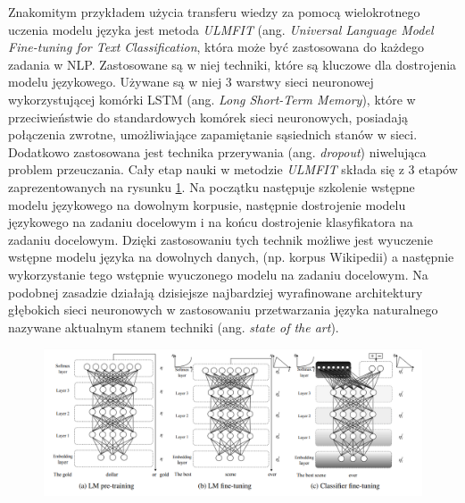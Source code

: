 Znakomitym przykładem użycia transferu wiedzy za pomocą wielokrotnego uczenia modelu języka jest metoda \textit{ULMFIT} \cite{howard2018universal} (ang. \textit{Universal Language Model Fine-tuning for Text Classification}, która może być zastosowana do każdego zadania w NLP. Zastosowane są w niej techniki, które są kluczowe dla dostrojenia modelu językowego. Używane są w niej 3 warstwy sieci neuronowej wykorzystującej komórki LSTM (ang. \textit{Long Short-Term Memory}), które w przeciwieństwie do standardowych komórek sieci neuronowych, posiadają połączenia zwrotne, umożliwiające zapamiętanie sąsiednich stanów w sieci. Dodatkowo zastosowana jest technika przerywania (ang. \textit{dropout}) niwelująca problem przeuczania. Cały etap nauki w metodzie \textit{ULMFIT} składa się z 3 etapów zaprezentowanych na rysunku \ref{rys:ulmfit}. Na początku następuje szkolenie wstępne modelu językowego na dowolnym korpusie, następnie dostrojenie modelu językowego na zadaniu docelowym i na końcu dostrojenie klasyfikatora na zadaniu docelowym. Dzięki zastosowaniu tych technik możliwe jest wyuczenie wstępne modelu języka na dowolnych danych, (np. korpus Wikipedii) a następnie wykorzystanie tego wstępnie wyuczonego modelu na zadaniu docelowym. Na podobnej zasadzie działają dzisiejsze najbardziej wyrafinowane architektury głębokich sieci neuronowych w zastosowaniu przetwarzania języka naturalnego nazywane aktualnym stanem techniki (ang. \textit{state of the art}).

\begin{figure}[t]
\centering\includegraphics[width=\textwidth]{figures/ulmfit.png}
\label{rys:ulmfit}
\end{figure}